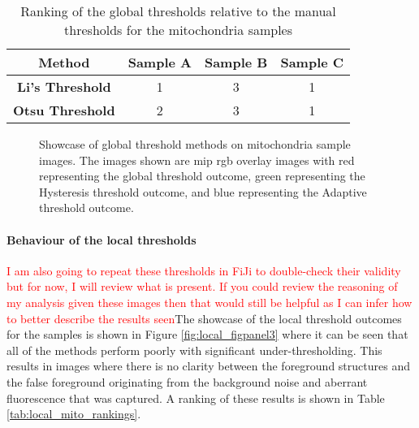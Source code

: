 \begin{table}[h!]
    \centering
    \begin{tabular}{|c|c|c|c|} \hline 
         \textbf{Method}&  \textbf{Sample A}&  \textbf{Sample B}& \textbf{Sample C}\\ \hline 
         \textbf{Li's Threshold}&  1&  3& 1\\ \hline 
         \textbf{Otsu Threshold}&  2&  3& 1\\ \hline
    \end{tabular}
    \caption{Ranking of the global thresholds relative to the manual thresholds for the mitochondria samples}
    \label{tab:global_mito_rankings}
\end{table}
\begin{figure}[h!]
    \centering
    \caption[Showcase of global threshold methods on mitochondria sample images]{Showcase of global threshold methods on mitochondria sample images. The images shown are \gls{mip} \gls{rgb} overlay images with red representing the global threshold outcome, green representing the Hysteresis threshold outcome, and blue representing the Adaptive threshold outcome.}
    \label{fig:mito_global_outcomes}
\end{figure}

\paragraph{Behaviour of the local thresholds}
\textcolor{red}{I am also going to repeat these thresholds in FiJi to double-check their validity but for now, I will review what is present. If you could review the reasoning of my analysis given these images then that would still be helpful as I can infer how to better describe the results seen}\newline The showcase of the local threshold outcomes for the samples is shown in Figure \ref{fig:local_figpanel3} where it can be seen that all of the methods perform poorly with significant under-thresholding. This results in images where there is no clarity between the foreground structures and the false foreground originating from the background noise and aberrant fluorescence that was captured. A ranking of these results is shown in Table \ref{tab:local_mito_rankings}.

